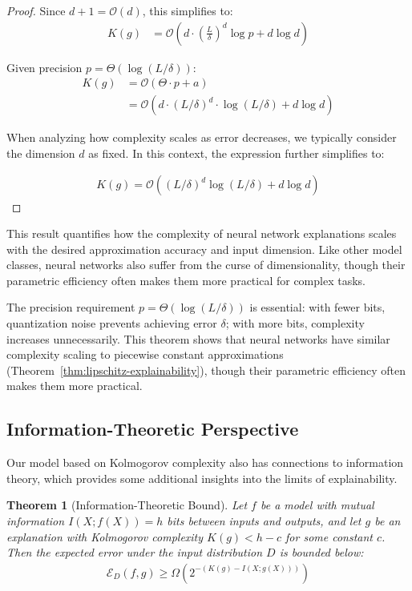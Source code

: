 \documentclass[11pt,letter,leqno]{article}
\newtheorem{theorem}{Theorem}[section]
\begin{document}
\begin{proof}
Since $d + 1 = \mathcal{O}(d)$, this simplifies to:
\begin{align}
K(g) &= \mathcal{O}\left(d \cdot \left(\frac{L}{\delta}\right)^d \log p + d \log d\right)
\end{align}

Given precision $p = \Theta(\log(L/\delta))$:
\begin{align}
K(g) &= \mathcal{O}(\Theta \cdot p + a)\\
&= \mathcal{O}\left(d \cdot (L/\delta)^d \cdot \log(L/\delta) + d \log d\right)
\end{align}

When analyzing how complexity scales as error decreases, we typically consider the dimension $d$ as fixed.  In this context, the expression further simplifies to:

\begin{align}
K(g) = \mathcal{O}\left((L/\delta)^d \log(L/\delta) + d \log d\right)
\end{align}

\end{proof}

This result quantifies how the complexity of neural network explanations scales with the desired approximation accuracy and input dimension.  Like other model classes, neural networks also suffer from the curse of dimensionality, though their parametric efficiency often makes them more practical for complex tasks.

The precision requirement $p = \Theta(\log(L/\delta))$ is essential: with fewer bits, quantization noise prevents achieving error $\delta$; with more bits, complexity increases unnecessarily. This theorem shows that neural networks have similar complexity scaling to piecewise constant approximations (Theorem~\ref{thm:lipschitz-explainability}), though their parametric efficiency often makes them more practical.

\subsection{Information-Theoretic Perspective}
\label{subsec:information-theory}

Our model based on Kolmogorov complexity also has connections to information theory, which provides some additional insights into the limits of explainability.

\begin{theorem}[Information-Theoretic Bound]
\label{thm:information-bound}
Let $f$ be a model with mutual information $I(X; f(X)) = h$ bits between inputs and outputs, and let $g$ be an explanation with Kolmogorov complexity $K(g) < h - c$ for some constant $c$.  Then the expected error under the input distribution $D$ is bounded below:
\begin{align}
\mathcal{E}_D(f, g) \geq \Omega\left(2^{-(K(g) - I(X; g(X)))}\right)
\end{align}
\end{theorem}
\end{document}

